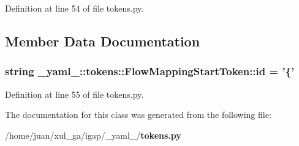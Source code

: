 Definition at line 54 of file tokens.py.

\subsection{Member Data Documentation}
\subsubsection{\setlength{\rightskip}{0pt plus 5cm}string {\bf \_\-yaml\_\-::tokens::FlowMappingStartToken::id} = '\{'\hspace{0.3cm}{\tt  [static]}}\label{class__yaml___1_1tokens_1_1FlowMappingStartToken_f6f649c748321851f8cf3dc0f15dc40e}




Definition at line 55 of file tokens.py.

The documentation for this class was generated from the following file:\begin{CompactItemize}
\item 
/home/juan/xul\_\-ga/igap/\_\-yaml\_\-/{\bf tokens.py}\end{CompactItemize}
